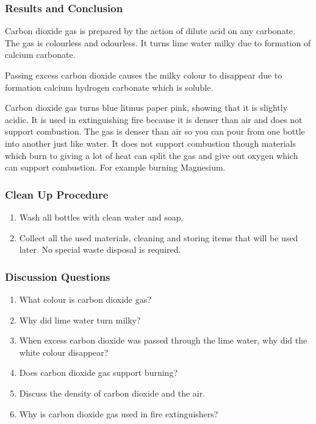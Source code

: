 \subsubsection*{Results and Conclusion}
Carbon dioxide gas is prepared by the action of dilute acid on any carbonate. The gas is colourless and odourless. It turns lime water milky due to formation of calcium carbonate.  
\begin{center}
\end{center}
Passing excess carbon dioxide causes the milky colour to disappear due to formation calcium hydrogen carbonate which is soluble.
\begin{center}
\end{center}
Carbon dioxide gas turns blue litmus paper pink, showing that it is slightly acidic. It is used in extinguishing fire because it is denser than air and does not support combustion.
The gas is denser than air so you can pour from one bottle into another just like water. It does not support combustion though materials which burn to giving a lot of heat can split the gas and give out oxygen which can support combustion. For example burning Magnesium.
\begin{center}
\end{center}

\subsubsection*{Clean Up Procedure}
\begin{enumerate}
\item{Wash all bottles with clean water and soap.}
\item{Collect all the used materials, cleaning and storing items that will be used later. No special waste disposal is required.}
\end{enumerate}

\subsubsection*{Discussion Questions}
\begin{enumerate}
\item{What colour is carbon dioxide gas?}
\item{Why did lime water turn milky?}
\item{When excess carbon dioxide was passed through the lime water, why did the white colour disappear?}
\item{Does carbon dioxide gas support burning?}
\item{Discuss the density of carbon dioxide and the air.}
\item{Why is carbon dioxide gas used in fire extinguishers?}
\end{enumerate}

